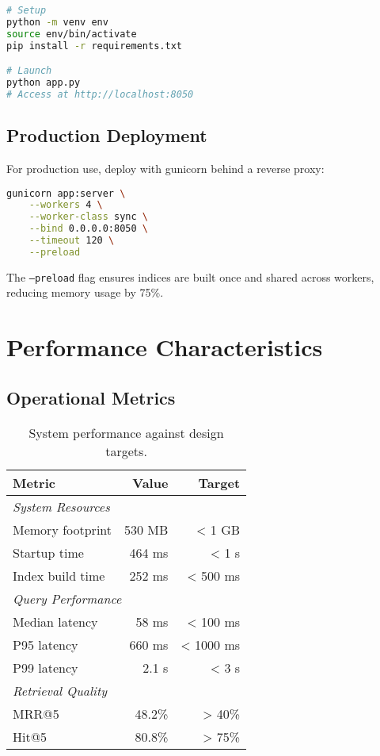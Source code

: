\begin{lstlisting}[language=bash, caption={Quick start}, label={lst:quickstart}]
# Setup
python -m venv env
source env/bin/activate
pip install -r requirements.txt

# Launch
python app.py
# Access at http://localhost:8050
\end{lstlisting}

\subsection{Production Deployment}

For production use, deploy with gunicorn behind a reverse proxy:

\begin{lstlisting}[language=bash, caption={Production configuration}, label={lst:production}]
gunicorn app:server \
    --workers 4 \
    --worker-class sync \
    --bind 0.0.0.0:8050 \
    --timeout 120 \
    --preload
\end{lstlisting}

The \texttt{--preload} flag ensures indices are built once and shared across workers, reducing memory usage by 75\%.

\section{Performance Characteristics}
\label{sec:app-performance}

\subsection{Operational Metrics}

\begin{table}[!ht]
\centering
\begin{tabular}{lrr}
\toprule
\textbf{Metric} & \textbf{Value} & \textbf{Target} \\
\midrule
\multicolumn{3}{l}{\textit{System Resources}} \\
Memory footprint & 530 MB & < 1 GB \\
Startup time & 464 ms & < 1 s \\
Index build time & 252 ms & < 500 ms \\
\midrule
\multicolumn{3}{l}{\textit{Query Performance}} \\
Median latency & 58 ms & < 100 ms \\
P95 latency & 660 ms & < 1000 ms \\
P99 latency & 2.1 s & < 3 s \\
\midrule
\multicolumn{3}{l}{\textit{Retrieval Quality}} \\
MRR@5 & 48.2\% & > 40\% \\
Hit@5 & 80.8\% & > 75\% \\
\bottomrule
\end{tabular}
\caption{System performance against design targets.}
\label{tab:performance-summary}
\end{table}

